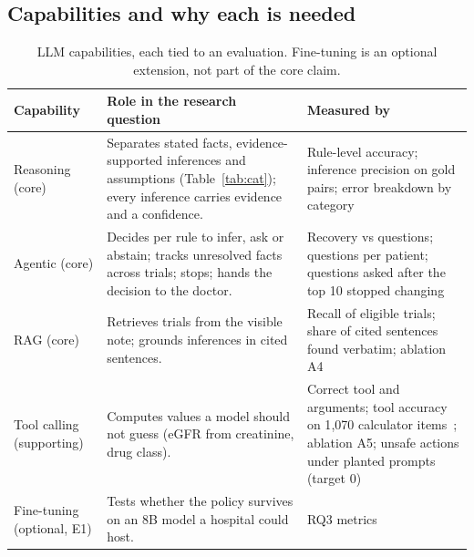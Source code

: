 \documentclass[10pt,a4paper]{article}
\begin{document}
\subsection{Capabilities and why each is needed}
\begin{table}[H]
\centering\footnotesize
\begin{tabularx}{\textwidth}{@{}P{1.9cm}LP{5.4cm}@{}}
\toprule
\textbf{Capability} & \textbf{Role in the research question} & \textbf{Measured by}\\
\midrule
Reasoning (core) & Separates stated facts, evidence-supported inferences and assumptions (Table~\ref{tab:cat}); every inference carries evidence and a confidence. & Rule-level accuracy; inference precision on gold pairs; error breakdown by category\\
Agentic (core) & Decides per rule to infer, ask or abstain; tracks unresolved facts across trials; stops; hands the decision to the doctor. & Recovery vs questions; questions per patient; questions asked after the top 10 stopped changing\\
RAG (core) & Retrieves trials from the visible note; grounds inferences in cited sentences. & Recall of eligible trials; share of cited sentences found verbatim; ablation A4\\
Tool calling (supporting) & Computes values a model should not guess (eGFR from creatinine, drug class). & Correct tool and arguments; tool accuracy on 1{,}070 calculator items~\cite{ekacalc}; ablation A5; unsafe actions under planted prompts (target 0)\\
Fine-tuning (optional, E1) & Tests whether the policy survives on an 8B model a hospital could host. & RQ3 metrics\\
\bottomrule
\end{tabularx}
\caption{LLM capabilities, each tied to an evaluation. Fine-tuning is an optional extension, not part of the core claim.}
\end{table}

\end{document}
